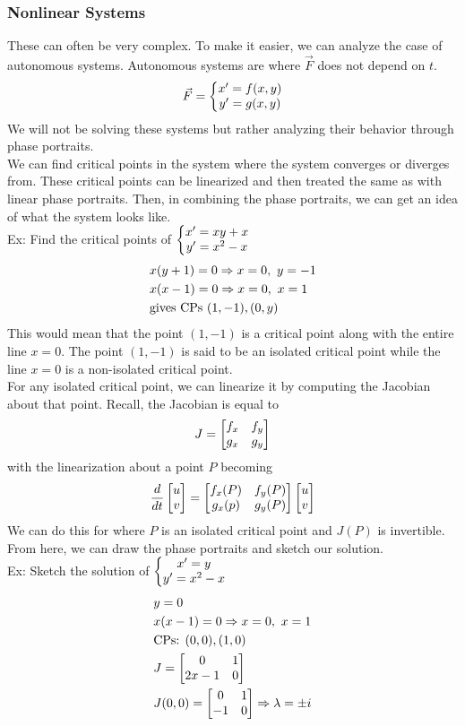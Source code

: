 \documentclass[11pt, fleqn]{article}
\begin{document}
\subsubsection{Nonlinear Systems}
These can often be very complex. To make it easier, we can analyze the case of autonomous systems. Autonomous systems are where $\vec{F}$ does not depend on $t$.
$$\vec{F}=\left\{\begin{matrix} x'=f(x,y)\\y'=g(x,y) \end{matrix}\right.$$
We will not be solving these systems but rather analyzing their behavior through phase portraits.\\
We can find critical points in the system where the system converges or diverges from. These critical points can be linearized and then treated the same as with linear phase portraits. Then, in combining the phase portraits, we can get an idea of what the system looks like.\\
Ex: Find the critical points of $\left\{\begin{matrix} x'=xy+x\\y'=x^2-x \end{matrix}\right.$
\begin{align*}
    &x(y+1)=0\Rightarrow x=0,\ y=-1\\
    &x(x-1)=0\Rightarrow x=0,\ x=1\\
    &\text{gives CPs }(1,-1),(0,y)
\end{align*}
This would mean that the point $(1,-1)$ is a critical point along with the entire line $x=0$. The point $(1,-1)$ is said to be an isolated critical point while the line $x=0$ is a non-isolated critical point.\\
For any isolated critical point, we can linearize it by computing the Jacobian about that point. Recall, the Jacobian is equal to
$$J=\matrixx{f_x&f_y\\g_x&g_y}$$
with the linearization about a point $P$ becoming
$$\frac{d}{dt}\matrixx{u\\v}=\matrixx{f_x(P)&f_y(P)\\g_x(p)&g_y(P)}\matrixx{u\\v}$$
We can do this for where $P$ is an isolated critical point and $J(P)$ is invertible.\\
From here, we can draw the phase portraits and sketch our solution.\\
Ex: Sketch the solution of $\left\{\begin{matrix} x'=y\\y'=x^2-x \end{matrix}\right.$
\begin{align*}
    &y=0\\
    &x(x-1)=0\Ra x=0,\ x=1\\
    &\text{CPs: }(0,0),(1,0)\\
    &J=\matrixx{0&1\\2x-1&0}\\
    &J(0,0)=\matrixx{0&1\\-1&0}\Ra \lambda=\pm i
\end{align*}
\end{document}

